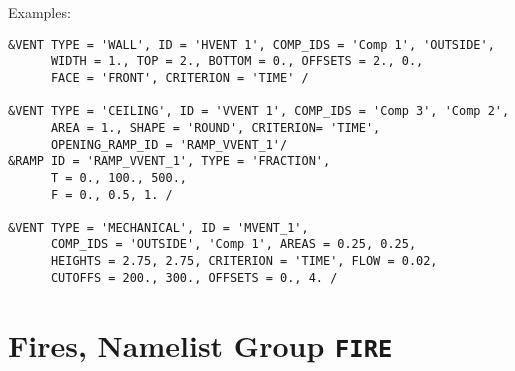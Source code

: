 \clearpage
\noindent Examples:
\begin{lstlisting}
&VENT TYPE = 'WALL', ID = 'HVENT 1', COMP_IDS = 'Comp 1', 'OUTSIDE',
      WIDTH = 1., TOP = 2., BOTTOM = 0., OFFSETS = 2., 0.,
      FACE = 'FRONT', CRITERION = 'TIME' /

&VENT TYPE = 'CEILING', ID = 'VVENT 1', COMP_IDS = 'Comp 3', 'Comp 2',
      AREA = 1., SHAPE = 'ROUND', CRITERION= 'TIME',
      OPENING_RAMP_ID = 'RAMP_VVENT_1'/
&RAMP ID = 'RAMP_VVENT_1', TYPE = 'FRACTION',
      T = 0., 100., 500.,
      F = 0., 0.5, 1. /

&VENT TYPE = 'MECHANICAL', ID = 'MVENT_1',
      COMP_IDS = 'OUTSIDE', 'Comp 1', AREAS = 0.25, 0.25,
      HEIGHTS = 2.75, 2.75, CRITERION = 'TIME', FLOW = 0.02,
      CUTOFFS = 200., 300., OFFSETS = 0., 4. /

\end{lstlisting}




\clearpage
\section{Fires, Namelist Group \texorpdfstring{{\tt FIRE}}{FIRE}}
\label{info:FIRE3}

